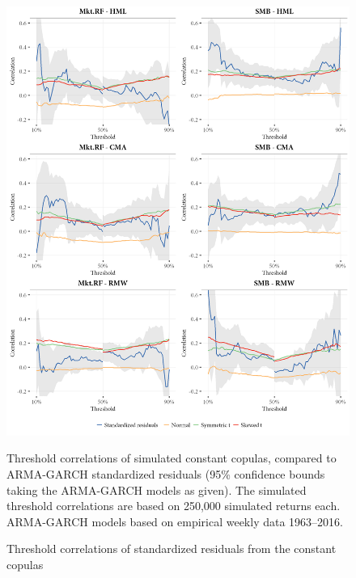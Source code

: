 \begin{figure}[!ht]
  \centering
  \includegraphics[scale=1]{graphics/threshold_simulated_1.png}  
  \footnotesize
  \caption{Threshold correlations of standardized residuals from the constant copulas}

  \begin{longcaption}
    Threshold correlations of simulated constant copulas, compared to ARMA-GARCH standardized residuals (95\% confidence bounds taking the ARMA-GARCH models as given). The simulated threshold correlations are based on 250,000 simulated returns each. ARMA-GARCH models based on empirical weekly data 1963--2016.
  \end{longcaption}
  \label{fig:threshold_simulated1}
\end{figure}
\pagebreak
